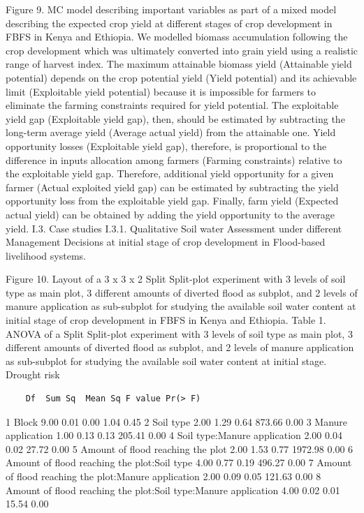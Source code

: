 \documentclass[12pt,oneside]{article}
\begin{document}
Figure 9. MC model describing important variables as part of a mixed model describing the expected crop yield at different stages of crop development in FBFS in Kenya and Ethiopia.
We modelled biomass accumulation following the crop development which was ultimately converted into grain yield using a realistic range of harvest index. The maximum attainable biomass yield (Attainable yield potential) depends on the crop potential yield (Yield potential) and its achievable limit (Exploitable yield potential) because it is impossible for farmers to eliminate the farming constraints required for yield potential. The exploitable yield gap (Exploitable yield gap), then, should be estimated by subtracting the long-term average yield (Average actual yield) from the attainable one. Yield opportunity losses (Exploitable yield gap), therefore, is proportional to the difference in inputs allocation among farmers (Farming constraints) relative to the exploitable yield gap. Therefore, additional yield opportunity for a given farmer (Actual exploited yield gap) can be estimated by subtracting the yield opportunity loss from the exploitable yield gap. Finally, farm yield (Expected actual yield) can be obtained by adding the yield opportunity to the average yield.
I.3. Case studies
I.3.1. Qualitative Soil water Assessment under different Management Decisions at initial stage of crop development in Flood-based livelihood systems.

Figure 10. Layout of a 3 x 3 x 2 Split Split-plot experiment with 3 levels of soil type as main plot, 3 different amounts of diverted flood as subplot, and 2 levels of manure application as sub-subplot for studying the available soil water content at initial stage of crop development in FBFS in Kenya and Ethiopia.
Table 1. ANOVA of a Split Split-plot experiment with 3 levels of soil type as main plot, 3 different amounts of diverted flood as subplot, and 2 levels of manure application as sub-subplot for studying the available soil water content at initial stage.
Drought risk

\begin{verbatim}
    Df  Sum Sq  Mean Sq F value Pr(> F)
\end{verbatim}

1 Block 9.00 0.01 0.00 1.04 0.45
2 Soil type 2.00 1.29 0.64 873.66 0.00
3 Manure application 1.00 0.13 0.13 205.41 0.00
4 Soil type:Manure application 2.00 0.04 0.02 27.72 0.00
5 Amount of flood reaching the plot 2.00 1.53 0.77 1972.98 0.00
6 Amount of flood reaching the plot:Soil type 4.00 0.77 0.19 496.27 0.00
7 Amount of flood reaching the plot:Manure application 2.00 0.09 0.05 121.63 0.00
8 Amount of flood reaching the plot:Soil type:Manure application 4.00 0.02 0.01 15.54 0.00
\end{document}
